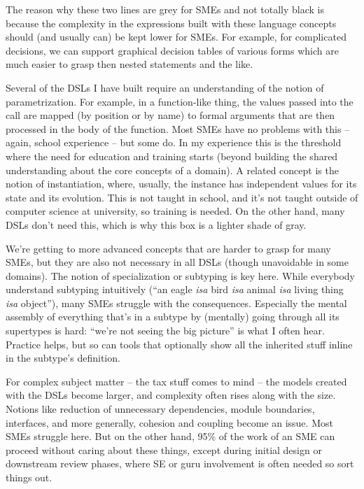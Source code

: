 \documentclass[runningheads]{llncs}
\newcommand{\ic}[1]{\changefont{cmtt}{m}{n}{#1}\normalfont}  %
\newcommand{\changefont}[3]{\fontfamily{#1}\fontseries{#2}\fontshape{#3}\selectfont}
\begin{document}
The reason why these two lines are grey for SMEs and not totally black is
because the complexity in the expressions built with these language concepts
should (and usually can) be kept lower for SMEs. For example, for complicated
decisions, we can support graphical decision tables of various forms which are
much easier to grasp then nested \ic{if} statements and the like. 

Several of the DSLs I have built require an understanding of the notion of
parametrization. For example, in a function-like thing, the values passed into
the call are mapped (by position or by name) to formal arguments that are then
processed in the body of the function. Most SMEs have no problems with this
-- again, school experience -- but some do. In my experience this is the 
threshold where the need for education and training starts (beyond building
the shared understanding about the core concepts of a domain). A related
concept is the notion of instantiation, where, usually, the instance has
independent values for its state and its evolution. This is not taught in
school, and it's not taught outside of computer science at university, so
training is needed. On the other hand, many DSLs don't need this, which is
why this box is a lighter shade of gray.

We're getting to more advanced concepts that are harder to grasp for many SMEs,
but they are also not necessary in all DSLs (though unavoidable in some
domains). The notion of specialization or subtyping is key here. While everybody
understand subtyping intuitively (``an eagle \emph{isa} bird \emph{isa} animal
\emph{isa} living thing \emph{isa} object''), many SMEs struggle with the
consequences. Especially the mental assembly of everything that's in a subtype
by (mentally) going through all its supertypes is hard: ``we're not seeing
the big picture'' is what I often hear. Practice helps, but so can tools that
optionally show all the inherited stuff inline in the subtype's definition.

For complex subject matter -- the tax stuff comes to mind -- the models created
with the DSLs become larger, and complexity often rises along with the size.
Notions like reduction of unnecessary dependencies, module boundaries,
interfaces, and more generally, cohesion and coupling become an issue. Most SMEs
struggle here. But on the other hand, 95\% of the work of an SME can proceed
without caring about these things, except during initial design or downstream
review phases, where SE or guru involvement is often needed so sort things out.
\end{document}
